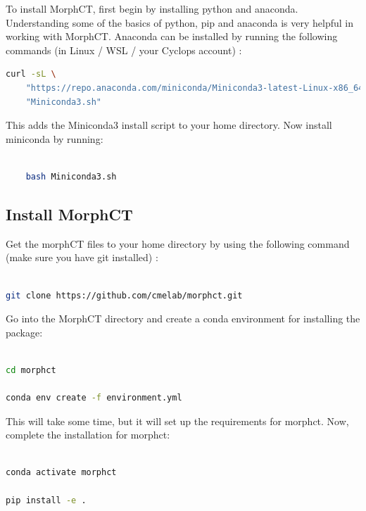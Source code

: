 \documentclass{article}
\begin{document}
To install MorphCT, first begin by installing python and anaconda. Understanding some of the basics of python, pip and anaconda is very helpful in working with MorphCT. Anaconda can be installed by running the following commands (in Linux / WSL / your Cyclops account) :

\begin{lstlisting}[language=bash]
    curl -sL \
    "https://repo.anaconda.com/miniconda/Miniconda3-latest-Linux-x86_64.sh" \ >
    "Miniconda3.sh"
\end{lstlisting}

This adds the Miniconda3 install script to your home directory. Now install miniconda by running:

\begin{lstlisting}[language=bash]

    bash Miniconda3.sh

\end{lstlisting}

\subsection{Install MorphCT}

Get the morphCT files to your home directory by using the following command (make sure you have git installed) :

\begin{lstlisting}[language=bash]

git clone https://github.com/cmelab/morphct.git

\end{lstlisting}

Go into the MorphCT directory and create a conda environment for installing the package:

\begin{lstlisting}[language=bash]

cd morphct

conda env create -f environment.yml

\end{lstlisting}

This will take some time, but it will set up the requirements for morphct. Now, complete the installation for morphct:

\begin{lstlisting}[language=bash]

conda activate morphct

pip install -e .

\end{lstlisting}
\end{document}
